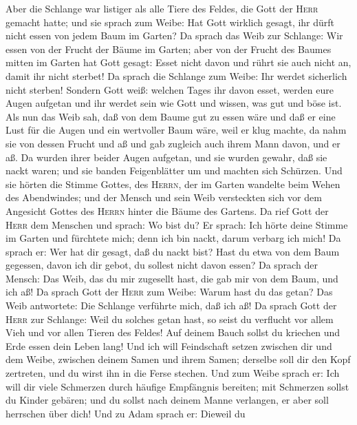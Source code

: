  Aber die Schlange war listiger als alle Tiere des Feldes,
die Gott der \textsc{Herr} gemacht hatte; und sie sprach zum Weibe: Hat
Gott wirklich gesagt, ihr dürft nicht essen von jedem Baum im Garten?
 Da sprach das Weib zur Schlange: Wir essen von der Frucht
der Bäume im Garten;  aber von der Frucht des Baumes
mitten im Garten hat Gott gesagt: Esset nicht davon und rührt sie auch
nicht an, damit ihr nicht sterbet!  Da sprach die Schlange
zum Weibe: Ihr werdet sicherlich nicht sterben!  Sondern
Gott weiß: welchen Tages ihr davon esset, werden eure Augen aufgetan und
ihr werdet sein wie Gott und wissen, was gut und böse ist.
 Als nun das Weib sah, daß von dem Baume gut zu essen wäre
und daß er eine Lust für die Augen und ein wertvoller Baum wäre, weil er
klug machte, da nahm sie von dessen Frucht und aß und gab zugleich auch
ihrem Mann davon, und er aß.  Da wurden ihrer beider Augen
aufgetan, und sie wurden gewahr, daß sie nackt waren; und sie banden
Feigenblätter um und machten sich Schürzen.  Und sie
hörten die Stimme Gottes, des \textsc{Herrn}, der im Garten wandelte
beim Wehen des Abendwindes; und der Mensch und sein Weib versteckten
sich vor dem Angesicht Gottes des \textsc{Herrn} hinter die Bäume des
Gartens.  Da rief Gott der \textsc{Herr} dem Menschen und
sprach: Wo bist du?  Er sprach: Ich hörte deine Stimme im
Garten und fürchtete mich; denn ich bin nackt, darum verbarg ich mich!
 Da sprach er: Wer hat dir gesagt, daß du nackt bist?
Hast du etwa von dem Baum gegessen, davon ich dir gebot, du sollest
nicht davon essen?  Da sprach der Mensch: Das Weib, das
du mir zugesellt hast, die gab mir von dem Baum, und ich aß!
 Da sprach Gott der \textsc{Herr} zum Weibe: Warum hast
du das getan? Das Weib antwortete: Die Schlange verführte mich, daß ich
aß!  Da sprach Gott der \textsc{Herr} zur Schlange: Weil
du solches getan hast, so seist du verflucht vor allem Vieh und vor
allen Tieren des Feldes! Auf deinem Bauch sollst du kriechen und Erde
essen dein Leben lang!  Und ich will Feindschaft setzen
zwischen dir und dem Weibe, zwischen deinem Samen und ihrem Samen;
derselbe soll dir den Kopf zertreten, und du wirst ihn in die Ferse
stechen.  Und zum Weibe sprach er: Ich will dir viele
Schmerzen durch häufige Empfängnis bereiten; mit Schmerzen sollst du
Kinder gebären; und du sollst nach deinem Manne verlangen, er aber soll
herrschen über dich!  Und zu Adam sprach er: Dieweil du
